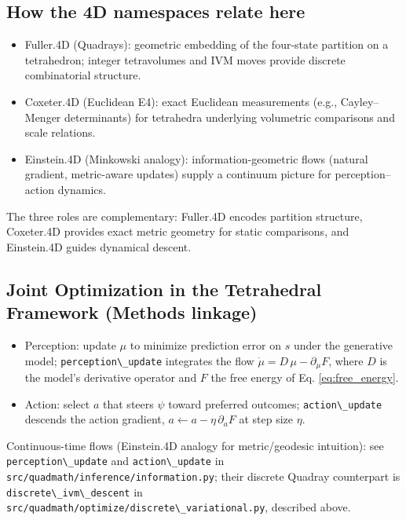 \documentclass[
  10pt,
]{article}
\newcommand{\passthrough}[1]{#1}
\providecommand{\tightlist}{%
  \setlength{\itemsep}{0pt}\setlength{\parskip}{0pt}}
\begin{document}
\subsection{How the 4D namespaces relate
here}\label{how-the-4d-namespaces-relate-here}

\begin{itemize}
\tightlist
\item
  Fuller.4D (Quadrays): geometric embedding of the four-state partition
  on a tetrahedron; integer tetravolumes and IVM moves provide discrete
  combinatorial structure.
\item
  Coxeter.4D (Euclidean E4): exact Euclidean measurements (e.g.,
  Cayley--Menger determinants) for tetrahedra underlying volumetric
  comparisons and scale relations.
\item
  Einstein.4D (Minkowski analogy): information-geometric flows (natural
  gradient, metric-aware updates) supply a continuum picture for
  perception--action dynamics.
\end{itemize}

The three roles are complementary: Fuller.4D encodes partition
structure, Coxeter.4D provides exact metric geometry for static
comparisons, and Einstein.4D guides dynamical descent.

\subsection{Joint Optimization in the Tetrahedral Framework (Methods
linkage)}\label{joint-optimization-in-the-tetrahedral-framework-methods-linkage}

\begin{itemize}
\tightlist
\item
  Perception: update \(\mu\) to minimize prediction error on \(s\) under
  the generative model; \passthrough{\lstinline!perception\_update!}
  integrates the flow \(\dot{\mu} = D\,\mu - \partial_{\mu} F\), where
  \(D\) is the model's derivative operator and \(F\) the free energy of
  Eq. \eqref{eq:free_energy}.
\item
  Action: select \(a\) that steers \(\psi\) toward preferred outcomes;
  \passthrough{\lstinline!action\_update!} descends the action gradient,
  \(a \leftarrow a - \eta\,\partial_{a} F\) at step size \(\eta\).
\end{itemize}

Continuous-time flows (Einstein.4D analogy for metric/geodesic
intuition): see \passthrough{\lstinline!perception\_update!} and
\passthrough{\lstinline!action\_update!} in
\passthrough{\lstinline!src/quadmath/inference/information.py!}; their
discrete Quadray counterpart is
\passthrough{\lstinline!discrete\_ivm\_descent!} in
\passthrough{\lstinline!src/quadmath/optimize/discrete\_variational.py!},
described above.
\end{document}
